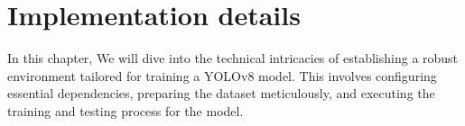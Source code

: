 \documentclass[12 pt]{report}
\begin{document}



\newpage
\chapter{Implementation details}
\justify
In this chapter, We will dive into the technical intricacies of establishing a robust environment tailored for training a YOLOv8 model. This involves configuring essential dependencies, preparing the dataset meticulously, and executing the training and testing process for the model.
\end{document}
